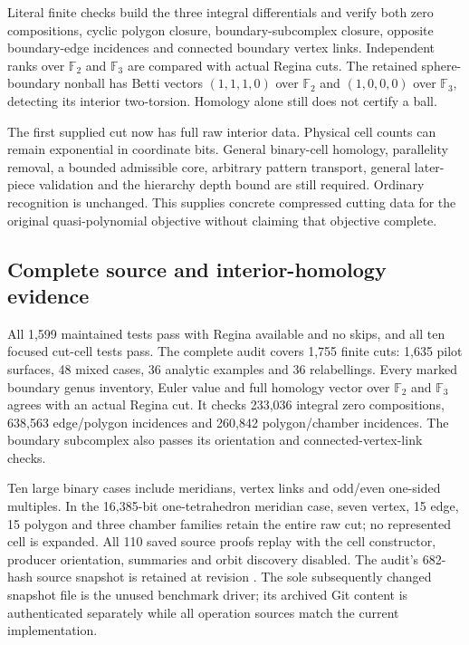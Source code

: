 Literal finite checks build the three integral differentials and verify
both zero compositions, cyclic polygon closure, boundary-subcomplex closure,
opposite boundary-edge incidences and connected boundary vertex links.
Independent ranks over $\mathbb F_2$ and $\mathbb F_3$ are compared with
actual Regina cuts. The retained sphere-boundary nonball has Betti vectors
$(1,1,1,0)$ over $\mathbb F_2$ and $(1,0,0,0)$ over $\mathbb F_3$, detecting
its interior two-torsion. Homology alone still does not certify a ball.

The first supplied cut now has full raw interior data. Physical cell counts
can remain exponential in coordinate bits. General binary-cell homology,
parallelity removal, a bounded admissible core, arbitrary pattern transport,
general later-piece validation and the hierarchy depth bound are still
required. Ordinary recognition is unchanged. This supplies concrete compressed
cutting data for the original quasi-polynomial objective without claiming
that objective complete.

\subsection{Complete source and interior-homology evidence}

All 1,599 maintained tests pass with Regina available and no skips, and
all ten focused cut-cell tests pass. The complete audit covers 1,755 finite
cuts: 1,635 pilot surfaces, 48 mixed cases, 36 analytic examples and 36
relabellings. Every marked boundary genus inventory, Euler value and full
homology vector over $\mathbb F_2$ and $\mathbb F_3$ agrees with an actual
Regina cut. It checks 233,036 integral zero compositions, 638,563 edge/polygon
incidences and 260,842 polygon/chamber incidences. The boundary subcomplex
also passes its orientation and connected-vertex-link checks.

Ten large binary cases include meridians, vertex links and odd/even one-sided
multiples. In the 16,385-bit one-tetrahedron meridian case, seven vertex,
15 edge, 15 polygon and three chamber families retain the entire raw cut;
no represented cell is expanded. All 110 saved source proofs replay with
the cell constructor, producer orientation, summaries and orbit discovery
disabled. The audit's 682-hash source snapshot is retained at revision
. The sole subsequently changed snapshot file is the unused
benchmark driver; its archived Git content is authenticated separately while
all operation sources match the current implementation.

